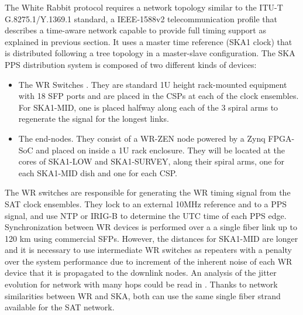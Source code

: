 %
%

The White Rabbit protocol requires a network topology similar to the ITU-T G.8275.1/Y.1369.1 standard, a IEEE-1588v2 telecommunication profile that describes a time-aware network capable to provide full timing support \cite{itu:TG8275_1_Y_1369_1} as explained in previous section. It uses a master time reference (SKA1 clock) that is distributed following a tree topology in a master-slave configuration. The SKA PPS distribution system is composed of two different kinds of devices: 

\begin{itemize}
	\item {The WR Switches \cite{sevensols:wr_switch}. They are standard 1U height rack-mounted equipment with 18 SFP ports and are placed in the CSPs at each of the clock ensembles. For SKA1-MID, one is placed halfway along each of the 3 spiral arms to regenerate the signal for the longest links.}
	\item{The end-nodes. They consist of a WR-ZEN node \cite{sevensols:wr_zen} powered by a Zynq FPGA-SoC and placed on inside a 1U rack enclosure. They will be located at the cores of SKA1-LOW and SKA1-SURVEY, along their spiral arms, one for each SKA1-MID dish and one for each CSP.}
\end{itemize}

The WR switches are responsible for generating the WR timing signal from the SAT clock ensembles. They lock to an external 10MHz reference and to a PPS signal, and use NTP or IRIG-B to determine the UTC time of each PPS edge. Synchronization between WR devices is performed over a a single fiber link up to 120 km using commercial SFPs.
However, the distances for SKA1-MID are longer and it is necessary to use 
intermediate WR switches as repeaters with a penalty over the system performance due to increment of the inherent noise of each WR device that it is propagated to the downlink nodes. An analysis of the jitter evolution for network with many hops could be read in \cite{torres2016scalability}. Thanks to network similarities between WR and SKA, both can use the same single fiber strand available for the SAT network. 

